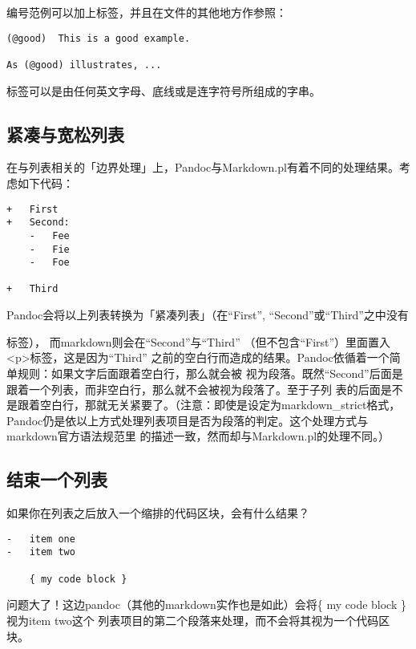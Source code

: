 \documentclass[fancyhdr,bookmark]{ctexbook}
\begin{document}
编号范例可以加上标签，并且在文件的其他地方作参照：

\begin{lstlisting}
(@good)  This is a good example.

As (@good) illustrates, ...
\end{lstlisting}

标签可以是由任何英文字母、底线或是连字符号所组成的字串。

\subsection{紧凑与宽松列表}\label{ux7d27ux51d1ux4e0eux5bbdux677eux5217ux8868}

在与列表相关的「边界处理」上，Pandoc与Markdown.pl有着不同的处理结果。考虑如下代码：

\begin{lstlisting}
+   First
+   Second:
    -   Fee
    -   Fie
    -   Foe

+   Third
\end{lstlisting}

Pandoc会将以上列表转换为「紧凑列表」（在``First'',
``Second''或``Third''之中没有

标签）， 而markdown则会在``Second''与``Third''
（但不包含``First''）里面置入\textless{}p\textgreater{}标签，这是因为``Third''
之前的空白行而造成的结果。Pandoc依循着一个简单规则：如果文字后面跟着空白行，那么就会被
视为段落。既然``Second''后面是跟着一个列表，而非空白行，那么就不会被视为段落了。至于子列
表的后面是不是跟着空白行，那就无关紧要了。（注意：即使是设定为markdown\_strict格式，
Pandoc仍是依以上方式处理列表项目是否为段落的判定。这个处理方式与markdown官方语法规范里
的描述一致，然而却与Markdown.pl的处理不同。）

\subsection{结束一个列表}\label{ux7ed3ux675fux4e00ux4e2aux5217ux8868}

如果你在列表之后放入一个缩排的代码区块，会有什么结果？

\begin{lstlisting}
-   item one
-   item two

    { my code block }
\end{lstlisting}

问题大了！这边pandoc（其他的markdown实作也是如此）会将\{ my code block
\}视为item two这个
列表项目的第二个段落来处理，而不会将其视为一个代码区块。
\end{document}

